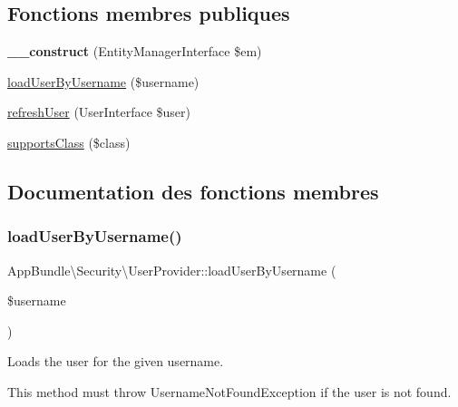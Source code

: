 \subsection*{Fonctions membres publiques}
\begin{DoxyCompactItemize}
\item 
\mbox{\label{classAppBundle_1_1Security_1_1UserProvider_a97a35f6c912b496c5abb18653655d51d}} 
{\bfseries \+\_\+\+\_\+construct} (Entity\+Manager\+Interface \$em)
\item 
\hyperlink{classAppBundle_1_1Security_1_1UserProvider_a00f367425384017ab3fdcaa62503be07}{load\+User\+By\+Username} (\$username)
\item 
\hyperlink{classAppBundle_1_1Security_1_1UserProvider_a4d9093d182287860fa773c3ef574c026}{refresh\+User} (User\+Interface \$user)
\item 
\hyperlink{classAppBundle_1_1Security_1_1UserProvider_a5a7658a77c854bd0b27c646a98e1feab}{supports\+Class} (\$class)
\end{DoxyCompactItemize}


\subsection{Documentation des fonctions membres}
\mbox{\label{classAppBundle_1_1Security_1_1UserProvider_a00f367425384017ab3fdcaa62503be07}} 
\subsubsection{\texorpdfstring{load\+User\+By\+Username()}{loadUserByUsername()}}
{\footnotesize\ttfamily App\+Bundle\textbackslash{}\+Security\textbackslash{}\+User\+Provider\+::load\+User\+By\+Username (\begin{DoxyParamCaption}\item[{}]{\$username }\end{DoxyParamCaption})}

Loads the user for the given username.

This method must throw Username\+Not\+Found\+Exception if the user is not found.


